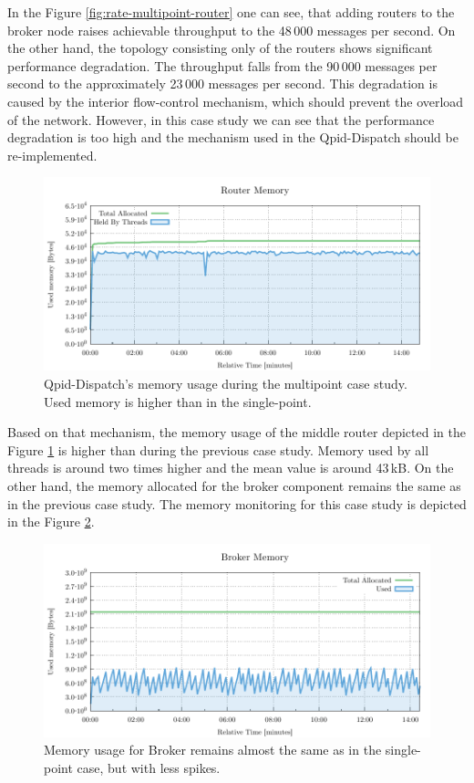 In the Figure \ref{fig:rate-multipoint-router} one can see, that adding routers to the broker node raises achievable throughput to the 48\,000 messages per second. On the other hand, the topology consisting only of the routers shows significant performance degradation. The throughput falls from the 90\,000 messages per second to the approximately 23\,000 messages per second. This degradation is caused by the interior flow-control mechanism, which should prevent the overload of the network. However, in this case study we can see that the performance degradation is too high and the mechanism used in the Qpid-Dispatch should be re-implemented.


\begin{figure}[H]
	\centering
	\includegraphics[width=1\linewidth]{obrazky-figures/charts/multipoint-router-only-throughput-memory.pdf}
	\caption{Qpid-Dispatch's memory usage during the multipoint case study. Used memory is higher than in the single-point.}
	\label{fig:router-multipoint-memory}
\end{figure}

Based on that mechanism, the memory usage of the middle router depicted in the Figure \ref{fig:router-multipoint-memory} is higher than during the previous case study. Memory used by all threads is around two times higher and the mean value is around 43\,kB. On the other hand, the memory allocated for the broker component remains the same as in the previous case study. The memory monitoring for this case study is depicted in the Figure \ref{fig:broker-multipoint-memory}.

\begin{figure}[H]
	\centering
	\includegraphics[width=1\linewidth]{obrazky-figures/charts/multipoint-router-broker-throughput-memory.pdf}
	\caption{Memory usage for Broker remains almost the same as in the single-point case, but with less spikes.}
	\label{fig:broker-multipoint-memory}
\end{figure}



